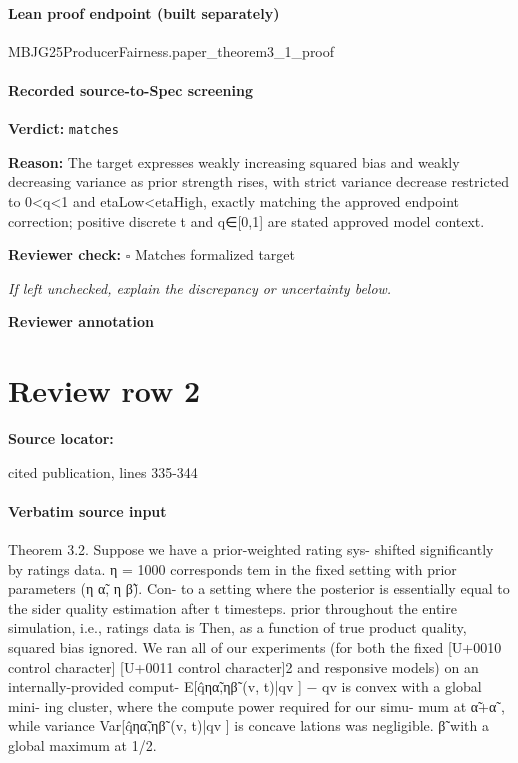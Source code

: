 \documentclass[10pt]{article}
\newcommand{\reviewerbox}{%
  \par\noindent\fbox{\parbox{0.96\linewidth}{\rule{0pt}{0.38in}}}\par
}
\newcommand{\reviewmatch}[1]{%
  \par\noindent\textbf{Reviewer check:} $\square$\; #1\par
  \noindent\emph{If left unchecked, explain the discrepancy or uncertainty below.}\par
}
\begin{document}
\paragraph{Lean proof endpoint (built separately)}\begin{ReviewVerbatim}
MBJG25ProducerFairness.paper_theorem3_1_proof
\end{ReviewVerbatim}

\paragraph{Recorded source-to-Spec screening}
\textbf{Verdict:} \texttt{matches}
\\
{\raggedright
\textbf{Reason:} The target expresses weakly increasing squared bias and weakly decreasing variance as prior strength rises, with strict variance decrease restricted to 0<q<1 and etaLow<etaHigh, exactly matching the approved endpoint correction;\allowbreak{} positive discrete t and q∈[0,1] are stated approved model context.\allowbreak{}
\par}
\reviewmatch{Matches formalized target}
\noindent\textbf{Reviewer annotation}\par
\reviewerbox
\clearpage
\hypertarget{source-claim-ad27f52afb94912c}{}
\section*{Review row 2}
\textbf{Source locator:} {\footnotesize\raggedright cited publication, lines 335-\allowbreak{}344\par}
\paragraph{Verbatim source input}
\begin{ReviewVerbatim}
Theorem 3.2. Suppose we have a prior-weighted rating sys-                      shifted significantly by ratings data. η = 1000 corresponds
tem in the fixed setting with prior parameters (η α̃, η β̃). Con-              to a setting where the posterior is essentially equal to the
sider quality estimation after t timesteps.                                    prior throughout the entire simulation, i.e., ratings data is
   Then, as a function of true product quality, squared bias                   ignored. We ran all of our experiments (for both the fixed
[U+0010 control character]                              [U+0011 control character]2                                              and responsive models) on an internally-provided comput-
  E[q̂ηα̃,ηβ̃ (v, t)|qv ] − qv    is convex with a global mini-                ing cluster, where the compute power required for our simu-
mum at α̃+α̃
                , while variance Var[q̂ηα̃,ηβ̃ (v, t)|qv ] is concave          lations was negligible.
             β̃
with a global maximum at 1/2.
\end{ReviewVerbatim}
\end{document}
